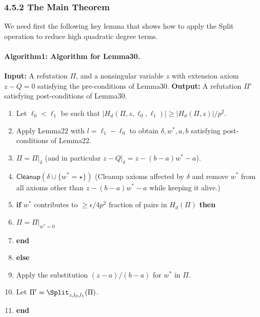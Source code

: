 \subsubsection*{4.5.2 The Main Theorem}
We need first the following key lemma that shows how to apply the Split operation to reduce high quadratic degree terms.
\paragraph{Algorithm1: Algorithm for Lemma30.}
\textbf{Input:} A refutation $\Pi$, and a nonsingular variable $z$ with extension axiom $z-Q=0$ satisfying the pre-conditions of Lemma30.
\textbf{Output:} A refutation $\Pi'$ satisfying post-conditions of Lemma30.
\begin{enumerate}[label=\arabic*,leftmargin=*]
\item Let $\ell_0<\ell_1$ be such that $|H_d(\Pi,z,\ell_0,\ell_1)|\geq|H_d(\Pi,z)|/p^2$.
\item Apply Lemma22 with $l=\ell_1-\ell_0$ to obtain $\delta,w^*,a,b$ satisfying post-conditions of Lemma22.
\item $\Pi=\Pi|_{\delta}$ (and in particular $z-Q|_{\delta}=z-(b-a)w^*-a$).
\item $\mathsf{Cleanup}(\delta\cup\{w^*=\star\})$ (Cleanup axioms affected by $\delta$ and remove $w^*$ from all axioms other than $z-(b-a)w^*-a$ while keeping it alive.)
\item \textbf{if} $w^*$ contributes to $\geq\epsilon/4p^2$ fraction of pairs in $H_d(\Pi)$ \textbf{then}
\item $\Pi=\Pi|_{w^*=0}$
\item \textbf{end}
\item \textbf{else}
\item Apply the substitution $(z-a)/(b-a)$ for $w^*$ in $\Pi$.
\item Let $\Pi'=\Split_{z,l_0,l_1}(\Pi)$.
\item \textbf{end}
\end{enumerate}
